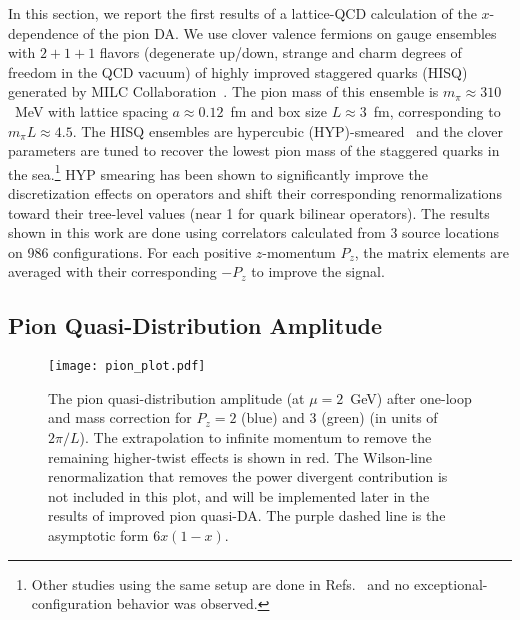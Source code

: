 
In this section, we report the first results of a lattice-QCD calculation of the $x$-dependence of the pion DA.
We use clover valence fermions on gauge ensembles with $2+1+1$ flavors (degenerate up/down, strange and charm degrees of freedom in the QCD vacuum) of highly improved staggered quarks (HISQ)~\cite{Follana:2006rc} generated by MILC Collaboration~\cite{Bazavov:2012xda}. The pion 
mass of this ensemble is $m_\pi \approx 310$~MeV with lattice spacing $a\approx 0.12$~fm and box size $L\approx 3$~fm, corresponding to $m_\pi L \approx 4.5$.
The HISQ ensembles are hypercubic (HYP)-smeared~\cite{Hasenfratz:2001hp} and the clover parameters are tuned to recover the lowest pion mass of the staggered quarks in the sea.\footnote{Other studies using the same setup are done in Refs.~\cite{Bhattacharya:2016zcn,Bhattacharya:2015wna,Bhattacharya:2015esa,Bhattacharya:2013ehc} and no exceptional-configuration behavior was observed.}   
HYP smearing has been shown to significantly improve the discretization effects on operators and shift their corresponding renormalizations toward their tree-level values (near 1 for quark bilinear operators). 
The results shown in this work are done using correlators calculated from 3 source locations on 986 configurations.  For each positive $z$-momentum $P_z$, the matrix elements are averaged with their corresponding $-P_z$ to improve the signal. 

\subsection{Pion Quasi-Distribution Amplitude}

\begin{figure}[tbp]
\texttt{[image: pion\_plot.pdf]}
\caption{The pion quasi-distribution amplitude (at $\mu=2$~GeV) after one-loop and mass correction for $P_z=2$ (blue) and $3$ (green) (in units of $2\pi/L$).
The extrapolation to infinite momentum to remove the remaining higher-twist effects is shown in red. The Wilson-line renormalization that removes the power divergent contribution is not included in this plot, and will be implemented later in the results of improved pion quasi-DA. The purple dashed line is the asymptotic form $6x(1-x)$.
}
\label{fig:pionDA}
\end{figure}


